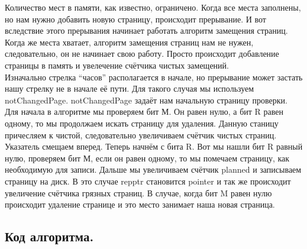 Количество мест в памяти, как известно, ограничено. Когда все места заполнены, но нам нужно добавить новую страницу, происходит прерывание. И вот вследствие этого прерывания начинает работать алгоритм замещения страниц.  Когда же места хватает, алгоритм замещения страниц нам не нужен, следовательно, он не начинает свою работу. Просто происходит добавление страницы в память и увелечение счётчика чистых замещений.\\
Изначально стрелка “часов” располагается в начале, но прерывание может застать нашу стрелку не в начале её пути. Для такого случая мы используем notChangedPage. notChangedPage задаёт нам начальную страницу проверки. Для начала в алгоритме мы проверяем бит М. Он равен нулю, а бит R равен одному, то мы продолжаем искать страницу для удаления. Данную станицу причесляем к чистой, следовательно увеличиваем счётчик чистых страниц. Указатель смещаем вперед. Теперь начнём с бита R. Вот мы нашли бит R равный нулю, проверяем бит М, если он равен одному, то мы помечаем страницу, как необходимую для записи. Дальше мы увеличиваем счётчик planned и записываем страницу на диск. В это случае  repptr становится pointer и так же происходит увеличение счётчика грязных страниц.  В случае, когда бит M равен нулю происходит удаление странице и это место занимает наша новая страница.

\subsection{Код алгоритма.}







